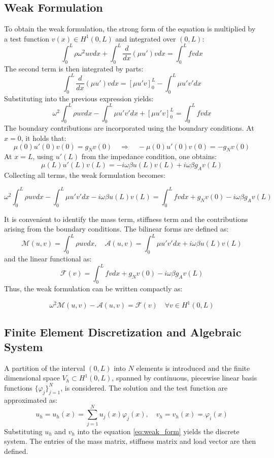 \subsection{Weak Formulation}

To obtain the weak formulation, the strong form of the equation is multiplied by a test function \( v(x) \in H^1(0,L) \) and integrated over \( (0,L) \):
\[
\int_0^L \rho \omega^2 u v dx + \int_0^L \frac{d}{dx} \left( \mu u' \right) vdx = \int_0^L f v dx
\]
The second term is then integrated by parts:
\[
\int_0^L \frac{d}{dx}(\mu u') v dx = \left[\mu u' v\right]_{0}^{L} - \int_0^L \mu u' v' dx
\]
Substituting into the previous expression yields:
\[
\omega^2\int_0^L \rho u v dx - \int_0^L \mu u' v' dx + \left[\mu u' v\right]_{0}^{L} = \int_0^L f vdx
\]
The boundary contributions are incorporated using the boundary conditions. At \( x=0 \), it holds that:
\[
\mu(0) u'(0) v(0) = g_N v(0)
\quad \Longrightarrow \quad 
-\mu(0) u'(0) v(0) = -g_N v(0)
\]
At \( x = L \), using \( u'(L) \) from the impedance condition, one obtains:
\[
\mu(L) u'(L) v(L) = -i \omega \beta u(L) v(L) + i \omega \beta g_A v(L)
\]
Collecting all terms, the weak formulation becomes:

\begin{equation}
\omega^2 \int_0^L \rho u v dx - \int_0^L \mu u' v' dx - i\omega\beta u(L) v(L) = \int_0^L f v dx + g_N v(0) - i\omega \beta g_A v(L)
\label{eq:weak_form}
\end{equation}

It is convenient to identify the mass term, stiffness term and the contributions arising from the boundary conditions. The bilinear forms are defined as:
\[
\mathcal{M}(u,v) = \int_0^L \rho u v dx,
\quad
\mathcal{A}(u,v) = \int_0^L \mu u' v' dx + i \omega \beta u(L) v(L)
\]
and the linear functional as:
\[
\mathcal{F}(v) = \int_0^L f v dx + g_N v(0) - i \omega \beta g_A v(L)
\]
Thus, the weak formulation can be written compactly as:

\begin{equation}
\omega^2 \mathcal{M}(u,v) - \mathcal{A}(u,v) = \mathcal{F}(v) \quad \forall v \in H^1(0,L)
\label{eq:comptweakform}
\end{equation}

\subsection{Finite Element Discretization and Algebraic System}

A partition of the interval \( (0,L) \) into \( N \) elements is introduced and the finite dimensional space \( V_h \subset H^1(0,L) \), spanned by continuous, piecewise linear basis functions \( \{\varphi_j\}_{j=1}^N \), is considered. The solution and the test function are approximated as:
\[
u_h = u_h(x) = \sum_{j=1}^N u_j(x) \varphi_j(x), \quad v_h = v_h(x) = \varphi_i(x)
\]
Substituting \( u_h \) and \( v_h \) into the equation \eqref{eq:weak_form} yields the discrete system. The entries of the mass matrix, stiffness matrix and load vector are then defined.

